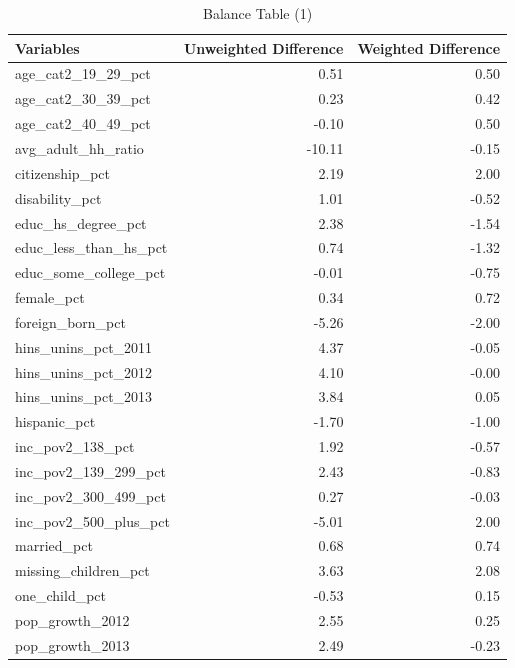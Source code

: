 \documentclass[12pt]{article}
\begin{document}
\begin{table}[ht]
\begin{tabular}{lrr}
  \toprule
Variables & Unweighted Difference & Weighted Difference \\ 
  \midrule
age\_cat2\_19\_29\_pct & 0.51 & 0.50 \\ 
  age\_cat2\_30\_39\_pct & 0.23 & 0.42 \\ 
  age\_cat2\_40\_49\_pct & -0.10 & 0.50 \\ 
  avg\_adult\_hh\_ratio & -10.11 & -0.15 \\ 
  citizenship\_pct & 2.19 & 2.00 \\ 
  disability\_pct & 1.01 & -0.52 \\ 
  educ\_hs\_degree\_pct & 2.38 & -1.54 \\ 
  educ\_less\_than\_hs\_pct & 0.74 & -1.32 \\ 
  educ\_some\_college\_pct & -0.01 & -0.75 \\ 
  female\_pct & 0.34 & 0.72 \\ 
  foreign\_born\_pct & -5.26 & -2.00 \\ 
  hins\_unins\_pct\_2011 & 4.37 & -0.05 \\ 
  hins\_unins\_pct\_2012 & 4.10 & -0.00 \\ 
  hins\_unins\_pct\_2013 & 3.84 & 0.05 \\ 
  hispanic\_pct & -1.70 & -1.00 \\ 
  inc\_pov2\_138\_pct & 1.92 & -0.57 \\ 
  inc\_pov2\_139\_299\_pct & 2.43 & -0.83 \\ 
  inc\_pov2\_300\_499\_pct & 0.27 & -0.03 \\ 
  inc\_pov2\_500\_plus\_pct & -5.01 & 2.00 \\ 
  married\_pct & 0.68 & 0.74 \\ 
  missing\_children\_pct & 3.63 & 2.08 \\ 
  one\_child\_pct & -0.53 & 0.15 \\ 
  pop\_growth\_2012 & 2.55 & 0.25 \\ 
  pop\_growth\_2013 & 2.49 & -0.23 \\ 
   \bottomrule
    \end{tabular}
    \caption{Balance Table (1)}
    \label{tab:baltab1}
\end{table}
\end{document}
